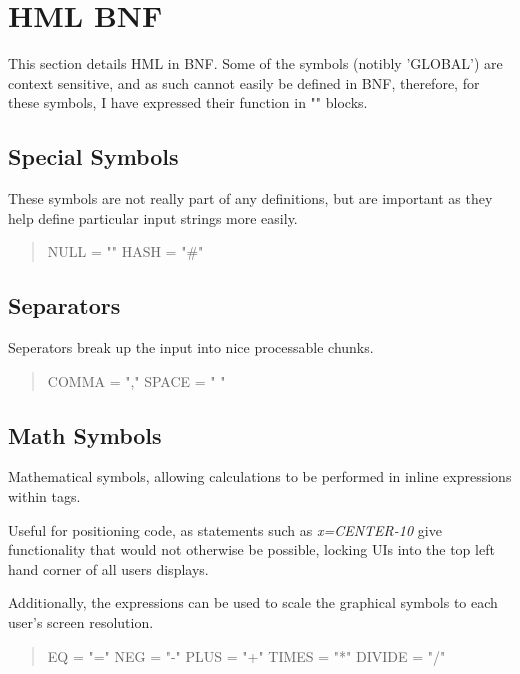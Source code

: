 \documentclass[10pt,a4paper]{article}
\begin{document}
\section{HML BNF}
This section details HML in BNF.  Some of the symbols (notibly 'GLOBAL') are context sensitive, and as such cannot easily be defined in BNF, therefore, for these symbols, I have expressed their function in "{}" blocks.

\subsection{Special Symbols}
These symbols are not really part of any definitions, but are important as they help define particular input strings more easily.

\begin{quote}
NULL		= ""\linebreak
HASH		= "\#"
\end{quote}

\subsection{Separators}
Seperators break up the input into nice processable chunks.

\begin{quote}
COMMA		= ","\linebreak
SPACE		= " "
\end{quote}

\subsection{Math Symbols}
Mathematical symbols, allowing calculations to be performed in inline expressions within tags.

Useful for positioning code, as statements such as \textit{x=CENTER-10} give functionality that would not otherwise be possible, locking UIs into the top left hand corner of all users displays.

Additionally, the expressions can be used to scale the graphical symbols to each user's screen resolution.

\begin{quote}
EQ = "="\linebreak
NEG	= "-"\linebreak
PLUS = "+"\linebreak
TIMES = "*"\linebreak
DIVIDE = "/"
\end{quote}
\end{document}
